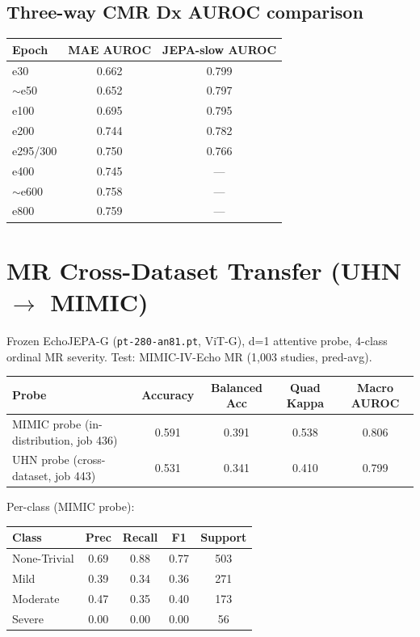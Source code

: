 \documentclass{article}
\begin{document}
\subsection{Three-way CMR Dx AUROC comparison}

\begin{center}
\begin{tabular}{lcc}
\toprule
Epoch & MAE AUROC & JEPA-slow AUROC \\
\midrule
e30  & 0.662 & 0.799 \\
$\sim$e50 & 0.652 & 0.797 \\
e100 & 0.695 & 0.795 \\
e200 & 0.744 & 0.782 \\
e295/300 & 0.750 & 0.766 \\
e400 & 0.745 & --- \\
$\sim$e600 & 0.758 & --- \\
e800 & 0.759 & --- \\
\bottomrule
\end{tabular}
\end{center}

\section{MR Cross-Dataset Transfer (UHN $\to$ MIMIC)}\label{sec:mr}

Frozen EchoJEPA-G (\texttt{pt-280-an81.pt}, ViT-G), d=1 attentive probe, 4-class ordinal MR severity. Test: MIMIC-IV-Echo MR (1{,}003 studies, pred-avg).

\begin{center}
\begin{tabular}{lcccc}
\toprule
Probe & Accuracy & Balanced Acc & Quad Kappa & Macro AUROC \\
\midrule
MIMIC probe (in-distribution, job 436) & 0.591 & 0.391 & 0.538 & 0.806 \\
UHN probe (cross-dataset, job 443)     & 0.531 & 0.341 & 0.410 & 0.799 \\
\bottomrule
\end{tabular}
\end{center}

Per-class (MIMIC probe):
\begin{center}
\begin{tabular}{lcccc}
\toprule
Class & Prec & Recall & F1 & Support \\
\midrule
None-Trivial & 0.69 & 0.88 & 0.77 & 503 \\
Mild         & 0.39 & 0.34 & 0.36 & 271 \\
Moderate     & 0.47 & 0.35 & 0.40 & 173 \\
Severe       & 0.00 & 0.00 & 0.00 & 56 \\
\bottomrule
\end{tabular}
\end{center}
\end{document}
